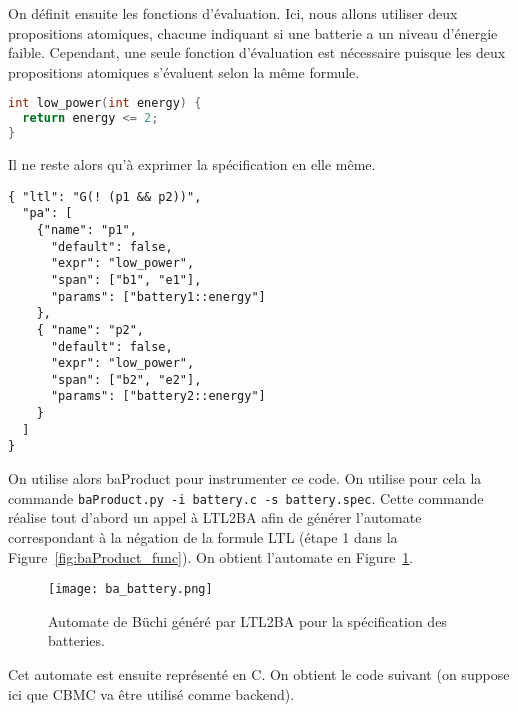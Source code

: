 On définit ensuite les fonctions d'évaluation. Ici, nous allons utiliser deux
propositions atomiques, chacune indiquant si une batterie a un niveau
d'énergie faible. Cependant, une seule fonction d'évaluation est nécessaire
puisque les deux propositions atomiques s'évaluent selon la même formule.

\begin{lstlisting}[language=C, frame=single, caption=Fonction d'évaluation]
int low_power(int energy) {
  return energy <= 2;
}
\end{lstlisting}

Il ne reste alors qu'à exprimer la spécification en elle même.

\pagebreak

\begin{lstlisting}[frame=single, caption=Spécification]
{ "ltl": "G(! (p1 && p2))",
  "pa": [
    {"name": "p1",
      "default": false,
      "expr": "low_power",
      "span": ["b1", "e1"],
      "params": ["battery1::energy"]
    },
    { "name": "p2",
      "default": false,
      "expr": "low_power",
      "span": ["b2", "e2"],
      "params": ["battery2::energy"]
    }
  ]
}
\end{lstlisting}

On utilise alors baProduct pour instrumenter ce code. On utilise pour cela
la commande \texttt{baProduct.py -i battery.c -s battery.spec}. Cette commande
réalise tout d'abord un appel à LTL2BA afin de générer l'automate correspondant
à la négation de la formule LTL (étape 1 dans la
Figure~\ref{fig:baProduct_func}). On obtient l'automate en
Figure~\ref{fig:ba_battery}.

\begin{figure}[ht]
\begin{center}
  \texttt{[image: ba\_battery.png]}
\end{center}
\caption{Automate de Büchi généré par LTL2BA pour la spécification des
batteries.}
\label{fig:ba_battery}
\end{figure}

Cet automate est ensuite représenté en C. On obtient le code suivant (on suppose
ici que CBMC va être utilisé comme backend).

